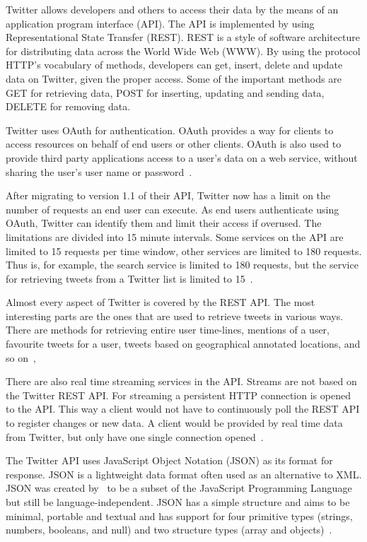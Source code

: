 Twitter allows developers and others to access their data by the means of an application program interface (API). The API is implemented by using Representational State Transfer (REST). REST is a style of software architecture for distributing data across the World Wide Web (WWW). By using the protocol HTTP's vocabulary of methods, developers can get, insert, delete and update data on Twitter, given the proper access. Some of the important methods are GET for retrieving data, POST for inserting, updating and sending data, DELETE for removing data.~\citep{article:rest}

Twitter uses OAuth for authentication. OAuth provides a way for clients to access resources on behalf of end users or other clients. OAuth is also used to provide third party applications access to a user's data on a web service, without sharing the user's user name or password~\citep{site:oauth}.

After migrating to version 1.1 of their API, Twitter now has a limit on the number of requests an end user can execute. As end users authenticate using OAuth, Twitter can identify them and limit their access if overused. The limitations are divided into 15 minute intervals. Some services on the API are limited to 15 requests per time window, other services are limited to 180 requests. Thus is, for example, the search service is limited to 180 requests, but the service for retrieving tweets from a Twitter list is limited to 15~\citep{site:twitterlimit}.

Almost every aspect of Twitter is covered by the REST API. The most interesting parts are the ones that are used to retrieve tweets in various ways. There are methods for retrieving entire user time-lines, mentions of a user, favourite tweets for a user, tweets based on geographical annotated locations, and so on~\citep{site:twitterapi},

There are also real time streaming services in the API. Streams are not based on the Twitter REST API. For streaming a persistent HTTP connection is opened to the API. This way a client would not have to continuously poll the REST API to register changes or new data. A client would be provided by real time data from Twitter, but only have one single connection opened~\citep{site:twitterstream}.

The Twitter API uses JavaScript Object Notation (JSON) as its format for response. JSON is a lightweight data format often used as an alternative to XML. JSON was created by~\citeauthor{site:json} to be a subset of the JavaScript Programming Language but still be language-independent. JSON has a simple structure and aims to be minimal, portable and textual and has support for four primitive types (strings, numbers, booleans, and null) and two structure types (array and objects)~\citep{site:json}.


